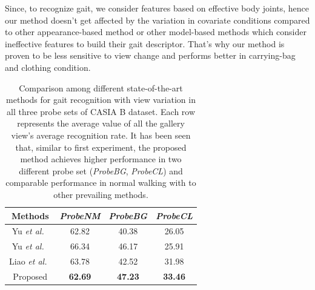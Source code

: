 Since, to recognize gait, we consider features based on effective body joints, hence our method doesn't get affected by the variation in covariate conditions compared to other appearance-based method or other model-based methods which consider ineffective features to build their gait descriptor. That’s why our method is proven to be less sensitive to view change and performs better in carrying-bag and clothing condition. 

\begin{table}
	\centering
	\caption{Comparison among different state-of-the-art methods for gait recognition with view variation in all three probe sets of CASIA B dataset.  Each row represents the average value of all the gallery view's average recognition rate. It has been seen that, similar to first experiment, the proposed method achieves higher performance in two different probe set (\textit{ProbeBG}, \textit{ProbeCL}) and comparable performance in normal walking with to other prevailing methods. \label{table:comp_casia_b_with_view}}
		
	{\begin{tabular*}{22pc}{cccc}\hline
				
				Methods &\textit{ProbeNM} &\textit{ProbeBG} &\textit{ProbeCL}\\
				\hline
				
				\noalign{\smallskip}
				Yu \textit{et al.}~\cite{Yu_17_spae} &62.82 &40.38 &26.05 \\ 
				
				
				\noalign{\smallskip}
				Yu \textit{et al.}~\cite{Yu_19} &66.34  &46.17  &25.91  \\
				
				\noalign{\smallskip}
				Liao \textit{et al.}~\cite{Liao_19}  &63.78  &42.52  &31.98  \\
				
				\noalign{\smallskip}
				Proposed &\textbf{62.69} &\textbf{47.23} &\textbf{33.46}\\
				\hline
\end{tabular*}}{}
\end{table}

